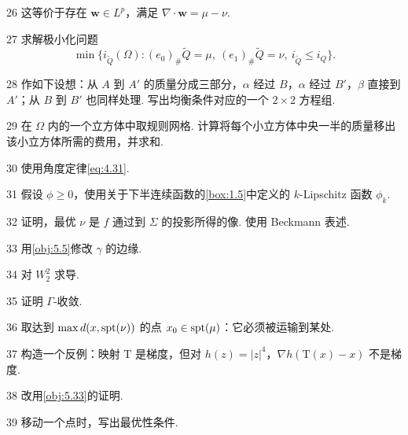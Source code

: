 \begin{sourcehint}{26}
这等价于存在 $\mathbf w\in L^p$，满足 $\nabla\cdot\mathbf w=\mu-\nu$.
\end{sourcehint}
\begin{sourcehint}{27}
求解极小化问题
\[
\min\{i_{\widetilde Q}(\Omega):(e_0)_\#\widetilde Q=\mu,\ (e_1)_\#\widetilde Q=\nu,\ i_{\widetilde Q}\leq i_Q\}.
\]
\end{sourcehint}
\begin{sourcehint}{28}
作如下设想：从 $A$ 到 $A'$ 的质量分成三部分，$\alpha$ 经过 $B$，$\alpha$ 经过 $B'$，$\beta$ 直接到 $A'$；从 $B$ 到 $B'$ 也同样处理. 写出均衡条件对应的一个 $2\times2$ 方程组.
\end{sourcehint}
\begin{sourcehint}{29}
在 $\Omega$ 内的一个立方体中取规则网格. 计算将每个小立方体中央一半的质量移出该小立方体所需的费用，并求和.
\end{sourcehint}
\begin{sourcehint}{30}
使用角度定律\eqref{eq:4.31}.
\end{sourcehint}
\begin{sourcehint}{31}
假设 $\phi\geq0$，使用关于下半连续函数的\autoref{box:1.5}中定义的 $k$-Lipschitz 函数 $\phi_k$.
\end{sourcehint}
\begin{sourcehint}{32}
证明，最优 $\nu$ 是 $f$ 通过到 $\Sigma$ 的投影所得的像. 使用 Beckmann 表述.
\end{sourcehint}
\begin{sourcehint}{33}
用\autoref{obj:5.5}修改 $\gamma$ 的边缘.
\end{sourcehint}
\begin{sourcehint}{34}
对 $W_2^2$ 求导.
\end{sourcehint}
\begin{sourcehint}{35}
证明 $\Gamma$-收敛.
\end{sourcehint}
\begin{sourcehint}{36}
取达到 $\max d(x,\operatorname{spt}(\nu))$ 的点 $x_0\in\operatorname{spt}(\mu)$：它必须被运输到某处.
\end{sourcehint}
\begin{sourcehint}{37}
构造一个反例：映射 $\mathrm T$ 是梯度，但对 $h(z)=|z|^4$，$\nabla h(\mathrm T(x)-x)$ 不是梯度.
\end{sourcehint}
\begin{sourcehint}{38}
改用\autoref{obj:5.33}的证明.
\end{sourcehint}
\begin{sourcehint}{39}
移动一个点时，写出最优性条件.
\end{sourcehint}
